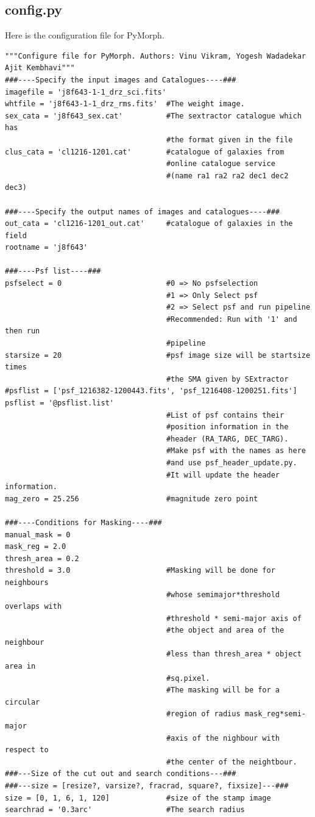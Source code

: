 \documentclass[a4paper,10pt]{article}
\begin{document}
\subsection{config.py}
Here is the configuration file for PyMorph.
\begin{footnotesize}
\begin{verbatim}
"""Configure file for PyMorph. Authors: Vinu Vikram, Yogesh Wadadekar Ajit Kembhavi"""
###----Specify the input images and Catalogues----###
imagefile = 'j8f643-1-1_drz_sci.fits'
whtfile = 'j8f643-1-1_drz_rms.fits'  #The weight image. 
sex_cata = 'j8f643_sex.cat'          #The sextractor catalogue which has 
                                     #the format given in the file
clus_cata = 'cl1216-1201.cat'        #catalogue of galaxies from
                                     #online catalogue service
                                     #(name ra1 ra2 ra2 dec1 dec2 dec3)

###----Specify the output names of images and catalogues----###
out_cata = 'cl1216-1201_out.cat'     #catalogue of galaxies in the field
rootname = 'j8f643'

###----Psf list----###
psfselect = 0                        #0 => No psfselection
                                     #1 => Only Select psf 
                                     #2 => Select psf and run pipeline
                                     #Recommended: Run with '1' and then run
                                     #pipeline
starsize = 20                        #psf image size will be startsize times 
                                     #the SMA given by SExtractor
#psflist = ['psf_1216382-1200443.fits', 'psf_1216408-1200251.fits']
psflist = '@psflist.list'
                                     #List of psf contains their 
                                     #position information in the 
                                     #header (RA_TARG, DEC_TARG). 
                                     #Make psf with the names as here 
                                     #and use psf_header_update.py. 
                                     #It will update the header information.
mag_zero = 25.256                    #magnitude zero point

###----Conditions for Masking----###
manual_mask = 0
mask_reg = 2.0
thresh_area = 0.2
threshold = 3.0                      #Masking will be done for neighbours 
                                     #whose semimajor*threshold overlaps with 
                                     #threshold * semi-major axis of 
                                     #the object and area of the neighbour 
                                     #less than thresh_area * object area in
                                     #sq.pixel. 
                                     #The masking will be for a circular 
                                     #region of radius mask_reg*semi-major 
                                     #axis of the nighbour with respect to 
                                     #the center of the neightbour.
###---Size of the cut out and search conditions---###
###---size = [resize?, varsize?, fracrad, square?, fixsize]---###
size = [0, 1, 6, 1, 120]             #size of the stamp image
searchrad = '0.3arc'                 #The search radius  


\end{verbatim}
\end{footnotesize}
\end{document}
